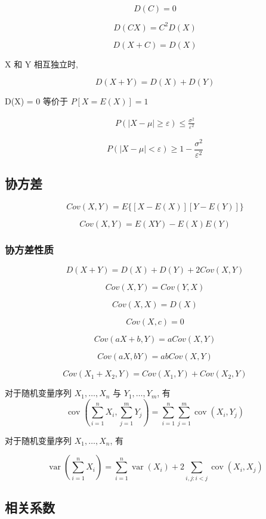 $$
 D(C) = 0
$$

$$
 D(CX) = C^2D(X)
$$

$$
 D(X+C) = D(X)
$$

X 和 Y 相互独立时,

$$
 D(X+Y) = D(X)+D(Y)
$$

D(X) = 0 等价于 $
 P[X = E(X)] = 1
$

\begin{theorem}[切比雪夫不等式]
    \label{Chebyshev\'sInequality}
$$
\begin{aligned}
    P(|X-\mu| \ge \varepsilon) \le \frac{\sigma^2}{\varepsilon^2}
\end{aligned}
$$

$$
 P(|X-\mu| < \varepsilon) \ge 1 - \frac{\sigma^2}{\varepsilon^2}
$$
\end{theorem}

\subsection{协方差}

$$
 Cov(X,Y) = E\Big\{ [X - E(X)][Y-E(Y)] \Big\}
$$

$$
 Cov(X,Y) = E(XY) - E(X)E(Y)
$$

\subsubsection{协方差性质}

$$
 D(X+Y) = D(X)+D(Y)+2Cov(X,Y)
$$

$$
 Cov(X,Y) = Cov(Y,X)
$$

$$
 Cov(X,X) = D(X)
$$

$$ Cov(X,c) = 0 $$

$$ Cov(a X + b, Y) = a Cov( X,Y) $$

$$ Cov(aX, bY) = ab Cov(X, Y) $$

$$ Cov(X_1 + X_2 , Y) = Cov(X_1 , Y) + Cov(X_2 , Y) $$

对于随机变量序列 $ X_{1}, \ldots, X_{n} $ 与 $ Y_{1}, \ldots, Y_{m} $, 有
$$
\operatorname{cov}\left(\sum_{i=1}^{n} X_{i}, \sum_{j=1}^{m} Y_{j}\right)=\sum_{i=1}^{n} \sum_{j=1}^{m} \operatorname{cov}\left(X_{i}, Y_{j}\right)
$$

对于随机变量序列 $ X_{1}, \ldots, X_{n} $, 有

$$
\operatorname{var}\left(\sum_{i=1}^{n} X_{i}\right)=\sum_{i=1}^{n} \operatorname{var}\left(X_{i}\right)+2 \sum_{i, j: i<j} \operatorname{cov}\left(X_{i}, X_{j}\right)
$$

\subsection{相关系数}

